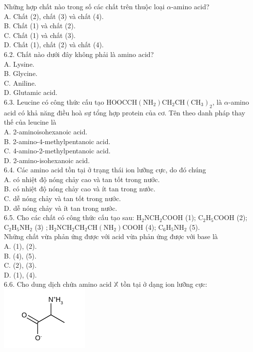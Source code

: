 \documentclass[10pt]{article}
\begin{document}
Những hợp chất nào trong số các chất trên thuộc loại $\alpha$-amino acid?\\
A. Chất (2), chất (3) và chất (4).\\
B. Chất (1) và chất (2).\\
C. Chất (1) và chất (3).\\
D. Chất (1), chất (2) và chất (4).\\
6.2. Chất nào dưới đây không phải là amino acid?\\
A. Lysine.\\
B. Glycine.\\
C. Aniline.\\
D. Glutamic acid.\\
6.3. Leucine có công thức cấu tạo $\mathrm{HOOCCH}\left(\mathrm{NH}_{2}\right) \mathrm{CH}_{2} \mathrm{CH}\left(\mathrm{CH}_{3}\right)_{2}$, là $\alpha$-amino acid có khả năng điều hoà sự tổng hợp protein của cơ. Tên theo danh pháp thay thế của leucine là\\
A. 2-aminoisohexanoic acid.\\
B. 2-amino-4-methylpentanoic acid.\\
C. 4-amino-2-methylpentanoic acid.\\
D. 2-amino-isohexanoic acid.\\
6.4. Các amino acid tồn tại ở trạng thái ion lưỡng cực, do đó chúng\\
A. có nhiệt độ nóng chảy cao và tan tốt trong nước.\\
B. có nhiệt độ nóng chảy cao và ít tan trong nước.\\
C. dễ nóng chảy và tan tốt trong nước.\\
D. dễ nóng chảy và ít tan trong nước.\\
6.5. Cho các chất có công thức cấu tạo sau: $\mathrm{H}_{2} \mathrm{NCH}_{2} \mathrm{COOH}$ (1); $\mathrm{C}_{2} \mathrm{H}_{5} \mathrm{COOH}$ (2); $\mathrm{C}_{2} \mathrm{H}_{5} \mathrm{NH}_{2}$ (3) $; \mathrm{H}_{2} \mathrm{NCH}_{2} \mathrm{CH}_{2} \mathrm{CH}\left(\mathrm{NH}_{2}\right) \mathrm{COOH}$ (4); $\mathrm{C}_{6} \mathrm{H}_{5} \mathrm{NH}_{2}$ (5).\\
Những chất vừa phản ứng được với acid vừa phản ứng được với base là\\
A. (1), (2).\\
B. (4), (5).\\
C. (2), (3).\\
D. (1), (4).\\
6.6. Cho dung dịch chứa amino acid $\mathbb{X}$ tồn tại ở dạng ion lưỡng cực:\\
\includegraphics{smile-e0d9861e09b1f028307d4be060a3fe07dfc1351b}
\end{document}
